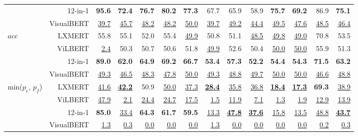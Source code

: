 \documentclass[11pt]{article}
\newcommand\redtable[1]{\underline{#1}}
\begin{document}
\begin{table*}[t!]
{\begin{tabular}{ l r r@{\hskip 0.2in}r@{\hskip 0.2in}rrr@{\hskip 0.2in}r@{\hskip 0.2in}rr@{\hskip 0.2in}rr@{\hskip 0.2in}r@{\hskip 0.2in}r }
        & \multirow{1}{*}{12-in-1} & {\bf 95.6} & {\bf 72.4} & {\bf 76.7} & {\bf 80.2} & {\bf 77.3} & 67.7 & 65.9 & 58.9 & {\bf 75.7} & {\bf 69.2} & 86.9 & {\bf 75.1} \\
        & \multirow{1}{*}{VisualBERT} & \redtable{39.7} & \redtable{45.7} & \redtable{48.2} & \redtable{48.2} & \redtable{50.0} & \redtable{39.7} & \redtable{49.2} & \redtable{44.4} & \redtable{49.5} & \redtable{47.6} & \redtable{48.5} & \redtable{46.4}\\
        \cmidrule{2-14}
        \multirow{4}{*}{$acc$}
        & \multirow{1}{*}{LXMERT} & 55.8 & 55.1 & 52.0 & 55.4 & \redtable{49.9} & 50.8 & 51.1 & \redtable{48.5} & \redtable{49.8} & \redtable{49.0} & 70.8 & 53.5 \\
        & \multirow{1}{*}{ViLBERT} & \redtable{2.4} & 50.3 & 50.7 & 50.6 & 51.8 & \redtable{49.9} & 52.6 & 50.4 & \redtable{50.0} & \redtable{50.0} & 55.9 & 51.3 \\
        & \multirow{1}{*}{12-in-1} & {\bf 89.0} & {\bf 62.0} & {\bf 64.9} & {\bf 69.2} & {\bf 66.7} & {\bf 53.4} & {\bf 57.3} & {\bf 52.2} & {\bf 54.4} & {\bf 54.3} & {\bf 71.5} & {\bf 63.2} \\
        & \multirow{1}{*}{VisualBERT} & \redtable{49.3} & \redtable{46.5} & \redtable{48.3} & \redtable{47.8} & \redtable{50.0} & \redtable{49.3} & \redtable{48.8} & \redtable{49.7} & \redtable{50.0} & \redtable{50.0} & \redtable{46.6} & \redtable{48.8} \\
        \cmidrule{2-14}
\cmidrule{2-14}
        \multirow{4}{*}{min($p_c$, $p_f$)}
        & \multirow{1}{*}{LXMERT} & \redtable{41.6}  & \redtable{\bf 42.2} & 50.9 & \redtable{50.0} & \redtable{37.3} & \redtable{\bf 28.4} & \redtable{35.8} & \redtable{36.8} & \redtable{\bf 18.4} & \redtable{\bf 17.3} & {\bf 69.3} & \redtable{38.9} \\
        & \multirow{1}{*}{ViLBERT} & \redtable{47.9} & \redtable{2.1} & \redtable{24.4} & \redtable{24.7} & \redtable{17.5} & \redtable{1.5} & \redtable{11.9} & \redtable{7.1} & \redtable{1.3} & \redtable{1.9} & \redtable{12.9} & \redtable{13.9} \\
        & \multirow{1}{*}{12-in-1} & {\bf 85.0} & \redtable{33.4} & {\bf 64.3} & {\bf 61.7} & {\bf 59.5} & \redtable{13.3} & \redtable{\bf 47.8} & \redtable{\bf 37.6} & \redtable{15.8} & \redtable{13.5} & \redtable{48.8} & \redtable{\bf 43.7} \\
        & \multirow{1}{*}{VisualBERT} & \redtable{1.3}  & \redtable{0.3} & \redtable{0.0} & \redtable{0.0} & \redtable{0.0} & \redtable{1.3} & \redtable{0.0} & \redtable{0.0} & \redtable{0.0} & \redtable{0.0} & \redtable{0.2} & \redtable{0.3} \\

\end{tabular}}
\end{table*}
\end{document}
